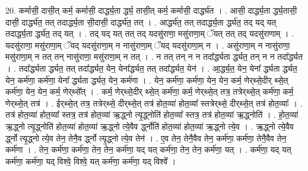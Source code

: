 \documentclass[17pt]{extarticle}
\begin{document}
20. कर्मासी॒ दासी॒त् कर्म॒ कर्मासी॒ दार्द्ध्य॒ता र्द्ध्य॒ तासी॒त् कर्म॒ कर्मासी॒ दार्द्ध्य॑त । . आसी॒ दार्द्ध्य॒ता र्द्ध्य॒तासी॒ दासी॒ दार्द्ध्य॑त॒ तत् तदार्द्ध्य॒ता सी॒दासी॒ दार्द्ध्य॑त॒ तत् । . आर्द्ध्य॑त॒ तत् तदार्द्ध्य॒ता र्द्ध्य॑त॒ तद् यद् यत् तदार्द्ध्य॒ता र्द्ध्य॑त॒ तद् यत् । . तद् यद् यत् तत् तद् यदसु॑राणा॒ मसु॑राणा॒म् ॅयत् तत् तद् यदसु॑राणाम् । . यदसु॑राणा॒ मसु॑राणा॒म् ॅयद् यदसु॑राणा॒म् न नासु॑राणा॒म् ॅयद् यदसु॑राणा॒म् न । . असु॑राणा॒म् न नासु॑राणा॒ मसु॑राणा॒म् न तत् तन् नासु॑राणा॒ मसु॑राणा॒म् न तत् । . न तत् तन् न न तदा᳚र्द्ध्यता र्द्ध्यत॒ तन् न न तदा᳚र्द्ध्यत । . तदा᳚र्द्ध्यता र्द्ध्यत॒ तत् तदा᳚र्द्ध्यत॒ येन॒ येना᳚र्द्ध्यत॒ तत् तदा᳚र्द्ध्यत॒ येन॑ । . आ॒र्द्ध्य॒त॒ येन॒ येना᳚ र्द्ध्यता र्द्ध्यत॒ येन॒ कर्म॑णा॒ कर्म॑णा॒ येना᳚ र्द्ध्यता र्द्ध्यत॒ येन॒ कर्म॑णा । . येन॒ कर्म॑णा॒ कर्म॑णा॒ येन॒ येन॒ कर्म॒ णेर्‌थ्से॒दीर् थ्से॒त् कर्म॑णा॒ येन॒ येन॒ कर्म॒ णेर्‌थ्से᳚त् । . कर्म॒ णेर्‌थ्से॒दीर् थ्से॒त् कर्म॑णा॒ कर्म॒ णेर्‌थ्से॒त् तत्र॒ तत्रेर्‌थ्से॒त् कर्म॑णा॒ कर्म॒ णेर्‌थ्से॒त् तत्र॑ । . ईर्‌थ्से॒त् तत्र॒ तत्रेर्‌थ्से॒ दीर्‌थ्से॒त् तत्र॑ होत॒व्या॑ होत॒व्या᳚ स्तत्रेर्‌थ्से॒ दीर्‌थ्से॒त् तत्र॑ होत॒व्याः᳚ । . तत्र॑ होत॒व्या॑ होत॒व्या᳚ स्तत्र॒ तत्र॑ होत॒व्या॑ ऋ॒द्ध्नो त्यृ॒द्ध्नोति॑ होत॒व्या᳚ स्तत्र॒ तत्र॑ होत॒व्या॑ ऋ॒द्ध्नोति॑ । . हो॒त॒व्या॑ ऋ॒द्ध्नो त्यृ॒द्ध्नोति॑ होत॒व्या॑ होत॒व्या॑ ऋ॒द्ध्नो त्ये॒वैव र्द्ध्नोति॑ होत॒व्या॑ होत॒व्या॑ ऋ॒द्ध्नो त्ये॒व । . ऋ॒द्ध्नो त्ये॒वैव र्द्ध्नो त्यृ॒द्ध्नो त्ये॒व तेन॒ तेनै॒व र्द्ध्नो त्यृ॒द्ध्नो त्ये॒व तेन॑ । . ए॒व तेन॒ तेनै॒वैव तेन॒ कर्म॑णा॒ कर्म॑णा॒ तेनै॒वैव तेन॒ कर्म॑णा । . तेन॒ कर्म॑णा॒ कर्म॑णा॒ तेन॒ तेन॒ कर्म॑णा॒ यद् यत् कर्म॑णा॒ तेन॒ तेन॒ कर्म॑णा॒ यत् । . कर्म॑णा॒ यद् यत् कर्म॑णा॒ कर्म॑णा॒ यद् विश्वे॒ विश्वे॒ यत् कर्म॑णा॒ कर्म॑णा॒ यद् विश्वे᳚ । \newline
\end{document}
